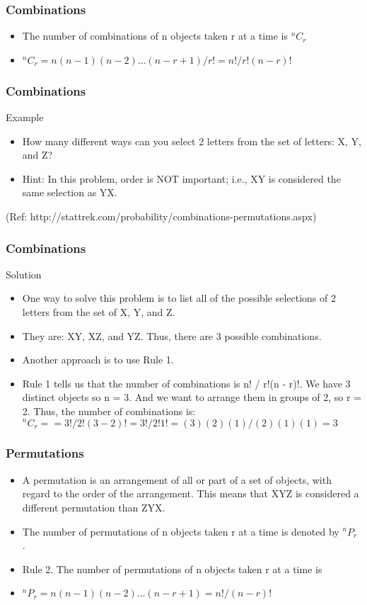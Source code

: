 \begin{frame}[fragile]\frametitle{Combinations}
\begin{itemize}
\item The number of combinations of n objects taken r at a time is ${}^{n}C_{r}$
\item ${}^{n}C_{r} = n(n - 1)(n - 2) \ldots (n - r + 1)/r! = n! / r!(n - r)!$
\end{itemize}
\end{frame}

\begin{frame}[fragile]\frametitle{Combinations}
Example
\begin{itemize}
\item How many different ways can you select 2 letters from the set of letters: X, Y, and Z? 
\item Hint: In this problem, order is NOT important; i.e., XY is considered the same selection as YX.
\end{itemize}

(Ref: http://stattrek.com/probability/combinations-permutations.aspx)
\end{frame}

\begin{frame}[fragile]\frametitle{Combinations}
Solution
\begin{itemize}
\item One way to solve this problem is to list all of the possible selections of 2 letters from the set of X, Y, and Z. 
\item They are: XY, XZ, and YZ. Thus, there are 3 possible
combinations.
\item Another approach is to use Rule 1. 
\item  Rule 1 tells us that the number of combinations is n! / r!(n - r)!. We have 3 distinct objects so n = 3. And we want to arrange them in groups of 2,
so r = 2. Thus, the number of combinations is:
${}^{n}C_{r} = = 3! / 2!(3 - 2)! = 3! /2!1! = (3)(2)(1)/(2)(1)(1) = 3$
\end{itemize}
\end{frame}

\begin{frame}[fragile]\frametitle{Permutations}
\begin{itemize}
\item A permutation is an arrangement of all or part of a set of objects, with regard to the order of the arrangement. This means that XYZ is considered a different permutation than
ZYX.
\item The number of permutations of n objects taken r at a time is denoted by ${}^{n}P_{r}$ .
\item Rule 2. The number of permutations of n objects taken r at a time is
\item ${}^{n}P_{r} = n(n - 1)(n - 2) ... (n - r + 1) = n! / (n - r)!$
\end{itemize}
\end{frame}


